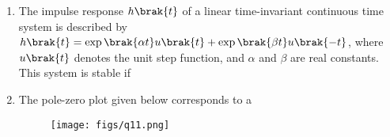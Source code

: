 \documentclass[a4paper, 11pt]{article}
\begin{document}
\begin{enumerate}
    \hfill{}

    \item The impulse response $h\brak{t}$ of a linear time-invariant continuous time system is described by $h\brak{t}=\exp\brak{\alpha t}u\brak{t}+\exp\brak{\beta t}u\brak{-t}$, where $u\brak{t}$ denotes the unit step function, and $\alpha$ and $\beta$ are real constants. This system is stable if
    
    \begin{enumerate}
    \end{enumerate}
    
    \hfill{}

    \item The pole-zero plot given below corresponds to a
    \begin{figure}[H]
        \centering
        \texttt{[image: figs/q11.png]}
        \caption*{}
        \label{fig:q11}
    \end{figure}
    
    \begin{enumerate}
    \end{enumerate}

    \hfill{}


\end{enumerate}
\end{document}
